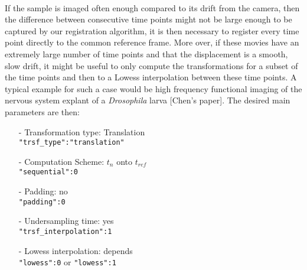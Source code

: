 \documentclass[10pt,a4paper]{book}
\begin{document}
\paragraph{}If the sample is imaged often enough compared to its drift from the camera, then the difference between consecutive time points might not be large enough to be captured by our registration algorithm, it is then necessary to register every time point directly to the common reference frame. More over, if these movies have an extremely large number of time points and that the displacement is a smooth, slow drift, it might be useful to only compute the transformations for a subset of the time points and then to a Lowess interpolation between these time points. A typical example for such a case would be high frequency functional imaging of the nervous system explant of a \textit{Drosophila} larva [Chen's paper]. The desired main parameters are then:
	\begin{itemize}
		\item[-] Transformation type: Translation\\
					\texttt{"trsf\_type":"translation"}
		\item[-] Computation Scheme: $t_n$ onto $t_{ref}$\\
					\texttt{"sequential":0}
		\item[-] Padding: no\\
					\texttt{"padding":0}
		\item[-] Undersampling time: yes\\
					\texttt{"trsf\_interpolation":1}
		\item[-] Lowess interpolation: depends\\
					\texttt{"lowess":0}
					or
					\texttt{"lowess":1}
	\end{itemize}
\end{document}
